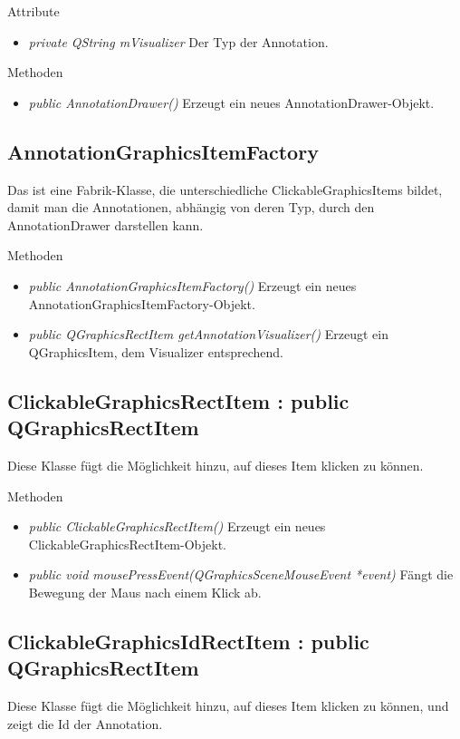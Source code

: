Attribute
\begin{itemize}
	\item\textit{private QString mVisualizer} 
	Der Typ der Annotation.   
\end{itemize}

Methoden
\begin{itemize}
	\item\textit{public AnnotationDrawer()} 
	Erzeugt ein neues AnnotationDrawer-Objekt.
\end{itemize}
  
\subsection*{AnnotationGraphicsItemFactory}
Das ist eine Fabrik-Klasse, die unterschiedliche ClickableGraphicsItems bildet, damit man die Annotationen, abhängig von deren Typ, durch den AnnotationDrawer darstellen kann.

Methoden
\begin{itemize}
	\item\textit{public AnnotationGraphicsItemFactory()} 
	Erzeugt ein neues AnnotationGraphicsItemFactory-Objekt.
	\item\textit{public QGraphicsRectItem getAnnotationVisualizer()} 
	Erzeugt ein QGraphicsItem, dem Visualizer entsprechend.
\end{itemize}
 
\subsection*{ClickableGraphicsRectItem : public QGraphicsRectItem}
Diese Klasse fügt die Möglichkeit hinzu, auf dieses Item klicken zu können.

Methoden
\begin{itemize}
	\item\textit{public ClickableGraphicsRectItem()}
	Erzeugt ein neues ClickableGraphicsRectItem-Objekt.
	\item\textit{public void mousePressEvent(QGraphicsSceneMouseEvent *event)}
	Fängt die Bewegung der Maus nach einem Klick ab.
\end{itemize}

\subsection*{ClickableGraphicsIdRectItem : public QGraphicsRectItem}
Diese Klasse fügt die Möglichkeit hinzu, auf dieses Item klicken zu können, und zeigt die Id der Annotation.

